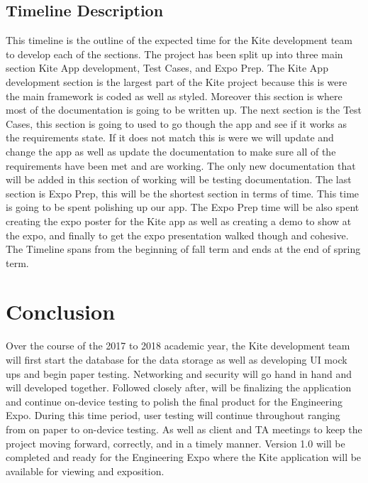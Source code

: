 \documentclass[compsoc, 10, draftclsnofoot, onecolumn]{IEEEtran}
\begin{document}
\subsection{Timeline Description} This timeline is the outline of the expected time for the Kite development team to develop each of the sections. The project has been split up into three main section  Kite App development, Test Cases, and Expo Prep. The Kite App development section is the largest part of the Kite project because this is were the main framework is coded as well as styled. Moreover this section is where most of the documentation is going to be written up. The next section is the Test Cases, this section is going to used to go though the app and see if it works as the requirements state. If it does not match this is were we will update and change the app as well as update the documentation to make sure all of the requirements have been met and are working. The only new documentation that will be added in this section of working will be testing documentation. The last section is Expo Prep, this will be the shortest section in terms of time. This time is going to be spent polishing up our app. The Expo Prep time will be also spent creating the expo poster for the Kite app as well as creating a demo to show at the expo, and finally to get the expo presentation walked though and cohesive. The Timeline spans from the beginning of fall term and ends at the end of spring term.   

\section{Conclusion}
Over the course of the 2017 to 2018 academic year, the Kite development team will first start the database for the data storage as well as developing UI mock ups and begin  paper testing. Networking and security will go hand in hand and will developed together. Followed closely after, will be finalizing the application and continue on-device testing to polish the final product for the Engineering Expo. During this time period, user testing will continue throughout ranging from on paper to on-device testing. As well as client and TA meetings to keep the project moving forward, correctly, and in a timely manner. Version 1.0 will be completed and ready for the Engineering Expo where the Kite application will be available for viewing and exposition.
  
\newpage
\end{document}
